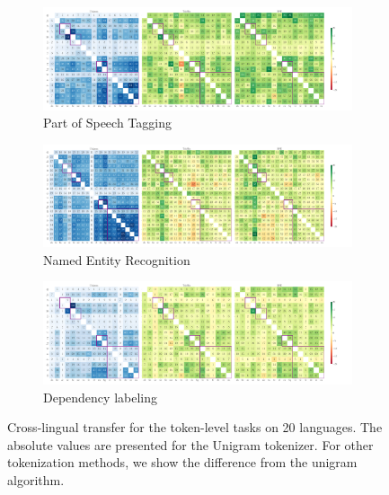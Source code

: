 
\begin{figure}[tb!]
    \centering
    \begin{subfigure}[b]{0.97\textwidth}
        \centering
        \includegraphics[width=0.97\linewidth]{figures/POS_F1_transfer_20l_.pdf}
    
        \caption{Part of Speech Tagging}
        \label{fig:pos_transfer_20l}
    \end{subfigure}

    \begin{subfigure}[b]{0.97\textwidth}

    \centering
    \includegraphics[width=1.\linewidth]{figures/NER_F1_transfer_20L.pdf}

    \caption{Named Entity Recognition}
    \label{fig:ner_transfer_20l}
    \end{subfigure}
    \begin{subfigure}[b]{0.97\textwidth}
        \centering
        \includegraphics[width=1.\linewidth]{figures/UD_F1_transfer_20l_.pdf}
    
        \caption{Dependency labeling}
        \label{fig:ud_transfer_20l}
    \end{subfigure}
    \caption{Cross-lingual transfer for the token-level tasks on 20 languages. The absolute values are presented for the Unigram tokenizer. For other tokenization methods, we show  the difference from the unigram algorithm.}

\end{figure}